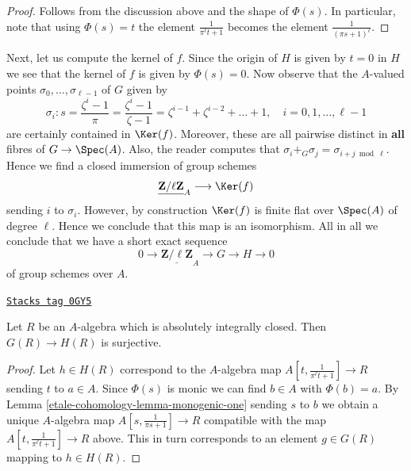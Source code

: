 \begin{proof}
Follows from the discussion above and the shape of $\Phi(s)$.
In particular, note that using $\Phi(s) = t$ the element
$\frac{1}{\pi^\ell t + 1}$ becomes the element
$\frac{1}{(\pi s + 1)^\ell}$.
\end{proof}

Next, let us compute the kernel of $f$. Since the origin of $H$ is
given by $t = 0$ in $H$ we see that the kernel of $f$ is given
by $\Phi(s) = 0$. Now observe that the $A$-valued points
$\sigma_0, \ldots, \sigma_{\ell - 1}$
of $G$ given by
$$
\sigma_i :
s = \frac{\zeta^i - 1}{\pi} = \frac{\zeta^i - 1}{\zeta - 1} =
\zeta^{i - 1} + \zeta^{i - 2} + \ldots + 1,\quad
i = 0, 1, \ldots, \ell - 1
$$
are certainly contained in $\Ker(f)$. Moreover, these are all pairwise
distinct in {\bf all} fibres of $G \to \Spec(A)$. Also, the reader
computes that $\sigma_i +_G \sigma_j = \sigma_{i + j \bmod \ell}$.
Hence we find a closed immersion of group schemes
$$
\underline{\mathbf{Z}/\ell \mathbf{Z}}_A \longrightarrow \Ker(f)
$$
sending $i$ to $\sigma_i$. However, by construction $\Ker(f)$
is finite flat over $\Spec(A)$ of degree $\ell$. Hence we conclude
that this map is an isomorphism. All in all we conclude that
we have a short exact sequence
\begin{equation}
\label{equation-ses}
0 \to
\underline{\mathbf{Z}/\ell \mathbf{Z}}_A
\to G
\to H
\to 0
\end{equation}
of group schemes over $A$.

\begin{lemma}
\label{etale-cohomology-lemma-lift-points-H-to-G}
\href{https://stacks.math.columbia.edu/tag/0GY5}{\texttt{Stacks tag 0GY5}}

Let $R$ be an $A$-algebra which is absolutely integrally closed. Then
$G(R) \to H(R)$ is surjective.
\end{lemma}

\begin{proof}
Let $h \in H(R)$ correspond to the $A$-algebra map
$A[t, \frac{1}{\pi^\ell t + 1}] \to R$ sending $t$ to $a \in A$.
Since $\Phi(s)$ is monic we can find $b \in A$
with $\Phi(b) = a$. By Lemma \ref{etale-cohomology-lemma-monogenic-one}
sending $s$ to $b$ we obtain a unique $A$-algebra map
$A[s, \frac{1}{\pi s + 1}] \to R$ compatible
with the map $A[t, \frac{1}{\pi^\ell t + 1}] \to R$ above.
This in turn corresponds to an element $g \in G(R)$
mapping to $h \in H(R)$.
\end{proof}


